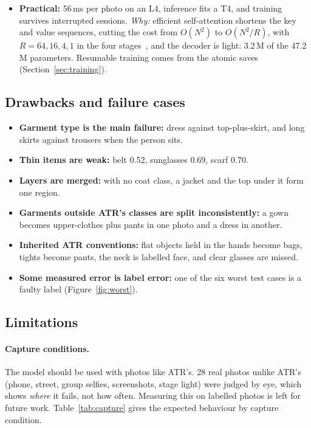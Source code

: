 \documentclass[conference,a4paper]{IEEEtran}
\begin{document}
\begin{itemize}
  \item \textbf{Practical:} 56\,ms per photo on an L4, inference fits a T4, and training survives interrupted sessions. \emph{Why:} efficient self-attention shortens the key and value sequences, cutting the cost from $O(N^2)$ to $O(N^2/R)$, with $R=64, 16, 4, 1$ in the four stages~\cite{segformer}, and the decoder is light: 3.2\,M of the 47.2\,M parameters. Resumable training comes from the atomic saves (Section~\ref{sec:training}).
\end{itemize}

\subsection{Drawbacks and failure cases}
\label{sec:drawbacks}
\begin{itemize}
  \item \textbf{Garment type is the main failure:} dress against top-plus-skirt, and long skirts against trousers when the person sits.
  \item \textbf{Thin items are weak:} belt 0.52, sunglasses 0.69, scarf 0.70.
  \item \textbf{Layers are merged:} with no coat class, a jacket and the top under it form one region.
  \item \textbf{Garments outside ATR's classes are split inconsistently:} a gown becomes upper-clothes plus pants in one photo and a dress in another.
  \item \textbf{Inherited ATR conventions:} flat objects held in the hands become bags, tights become pants, the neck is labelled face, and clear glasses are missed.
  \item \textbf{Some measured error is label error:} one of the six worst test cases is a faulty label (Figure~\ref{fig:worst}).
\end{itemize}


\subsection{Limitations}
\label{sec:limits}

\paragraph{Capture conditions.}
The model should be used with photos like ATR's. 28 real photos unlike ATR's (phone, street, group selfies, screenshots, stage light) were judged by eye, which shows \emph{where} it fails, not how often. Measuring this on labelled photos is left for future work. Table~\ref{tab:capture} gives the expected behaviour by capture condition.
\end{document}
